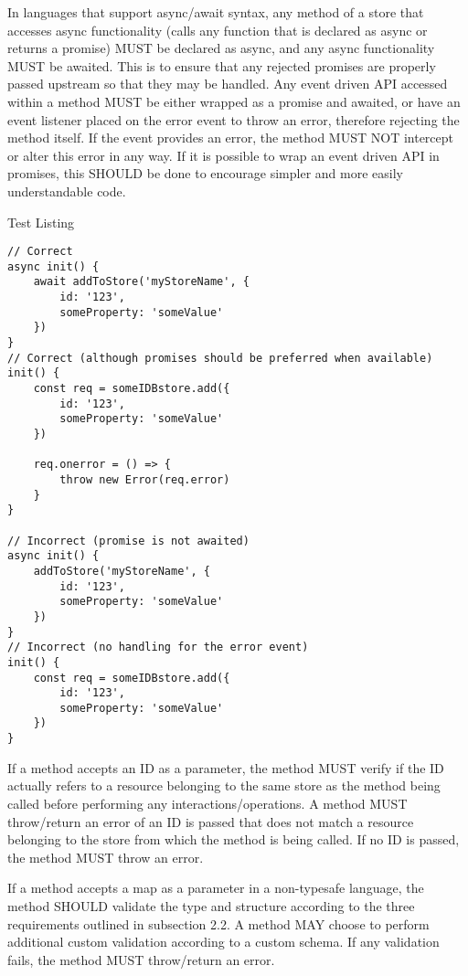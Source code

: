 \documentclass{article}
\begin{document}
In languages that support async/await syntax, any method of a store that accesses async functionality (calls any function that is declared as async or returns a promise) MUST be declared as async, and any async functionality MUST be awaited. This is to ensure that any rejected promises are properly passed upstream so that they may be handled. Any event driven API accessed within a method MUST be either wrapped as a promise and awaited, or have an event listener placed on the error event to throw an error, therefore rejecting the method itself. If the event provides an error, the method MUST NOT intercept or alter this error in any way. If it is possible to wrap an event driven API in promises, this SHOULD be done to encourage simpler and more easily understandable code.

\newpage

\begin{listing}[!ht]
\caption{Test Listing}
\begin{verbatim}
// Correct
async init() {
    await addToStore('myStoreName', {
        id: '123',
        someProperty: 'someValue'
    })
}
// Correct (although promises should be preferred when available)
init() {
    const req = someIDBstore.add({
        id: '123',
        someProperty: 'someValue'
    })
    
    req.onerror = () => {
        throw new Error(req.error)
    }
}

// Incorrect (promise is not awaited)
async init() {
    addToStore('myStoreName', {
        id: '123',
        someProperty: 'someValue'
    })
}
// Incorrect (no handling for the error event)
init() {
    const req = someIDBstore.add({
        id: '123',
        someProperty: 'someValue'
    })
}
\end{verbatim}
\end{listing}

If a method accepts an ID as a parameter, the method MUST verify if the ID actually refers to a resource belonging to the same store as the method being called before performing any interactions/operations. A method MUST throw/return an error of an ID is passed that does not match a resource belonging to the store from which the method is being called. If no ID is passed, the method MUST throw an error. 

If a method accepts a map as a parameter in a non-typesafe language, the method SHOULD validate the type and structure according to the three requirements outlined in subsection 2.2. A method MAY choose to perform additional custom validation according to a custom schema. If any validation fails, the method MUST throw/return an error.
\end{document}
